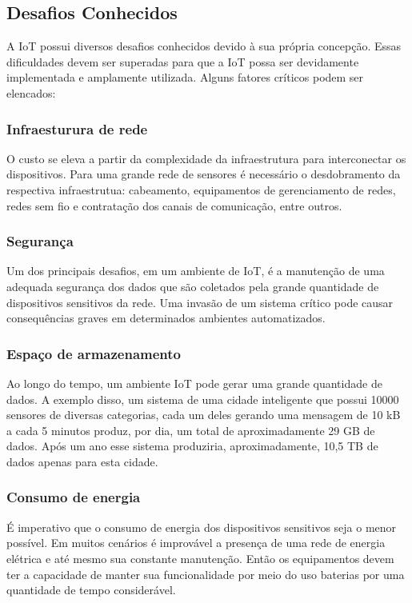 
\subsection{Desafios Conhecidos}
	\quad A \acrlong{IoT} possui diversos desafios conhecidos devido à sua própria concepção. Essas dificuldades devem ser superadas para que a
	\acrshort{IoT} possa ser devidamente implementada e amplamente utilizada. Alguns fatores críticos podem ser elencados:
	\subsubsection{Infraesturura de rede}
		\quad O custo se eleva a partir da complexidade da infraestrutura para interconectar os dispositivos. Para uma grande rede de sensores é necessário o desdobramento da respectiva infraestrutua:
		 cabeamento, equipamentos de gerenciamento de redes, redes sem fio e contratação dos canais de comunicação, entre outros.
	\subsubsection{Segurança}
		\quad Um dos principais desafios, em um ambiente de \acrlong{IoT}, é a manutenção de uma adequada segurança dos dados que são coletados pela grande quantidade de
		dispositivos sensitivos da rede. Uma invasão de um sistema crítico pode causar consequências graves em determinados ambientes automatizados.
  \subsubsection{Espaço de armazenamento}
	  \quad Ao longo do tempo, um ambiente \acrshort{IoT} pode gerar uma grande quantidade de dados. A exemplo disso, um sistema de uma cidade inteligente que possui 10000 sensores
 	  de diversas categorias, cada um deles gerando uma mensagem de 10 kB a cada 5 minutos produz, por dia, um total de aproximadamente 29 GB de dados.
	  Após um ano esse sistema produziria, aproximadamente, 10,5 TB de dados apenas para esta cidade.
  \subsubsection{Consumo de energia}
		\quad É imperativo que o consumo de energia dos dispositivos sensitivos seja o menor possível. Em muitos cenários é improvável a presença de uma
		rede de energia elétrica e até mesmo sua constante manutenção. Então os equipamentos devem ter a capacidade de manter sua funcionalidade por meio do uso baterias por
		uma quantidade de tempo considerável.



